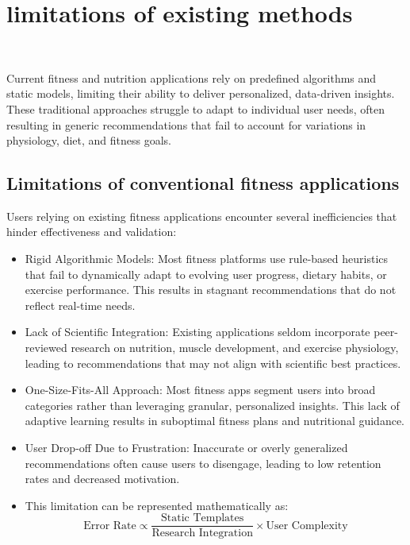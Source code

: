 \documentclass[conference]{IEEEtran}
\begin{document}
\section{limitations of existing methods}\

Current fitness and nutrition applications rely on predefined algorithms and static models, limiting their ability to deliver personalized, data-driven insights. These traditional approaches struggle to adapt to individual user needs, often resulting in generic recommendations that fail to account for variations in physiology, diet, and fitness goals.

\subsection{Limitations of conventional fitness applications}

Users relying on existing fitness applications encounter several inefficiencies that hinder effectiveness and validation:\\

\begin{itemize}
	\item Rigid Algorithmic Models: Most fitness platforms use rule-based heuristics that fail to dynamically adapt to evolving user progress, dietary habits, or exercise performance. This results in stagnant recommendations that do not reflect real-time needs.
	\item Lack of Scientific Integration: Existing applications seldom incorporate peer-reviewed research on nutrition, muscle development, and exercise physiology, leading to recommendations that may not align with scientific best practices. \cite{7}
	\item One-Size-Fits-All Approach: Most fitness apps segment users into broad categories rather than leveraging granular, personalized insights. This lack of adaptive learning results in suboptimal fitness plans and nutritional guidance.
	\item User Drop-off Due to Frustration: Inaccurate or overly generalized recommendations often cause users to disengage, leading to low retention rates and decreased motivation. \cite{8}
        \item This limitation can be represented mathematically as:
            \begin{equation}
            \text{Error Rate} \propto \frac{\text{Static Templates}}{\text{Research Integration}} \times \text{User Complexity}
\end{equation}
\end{itemize}
\end{document}
